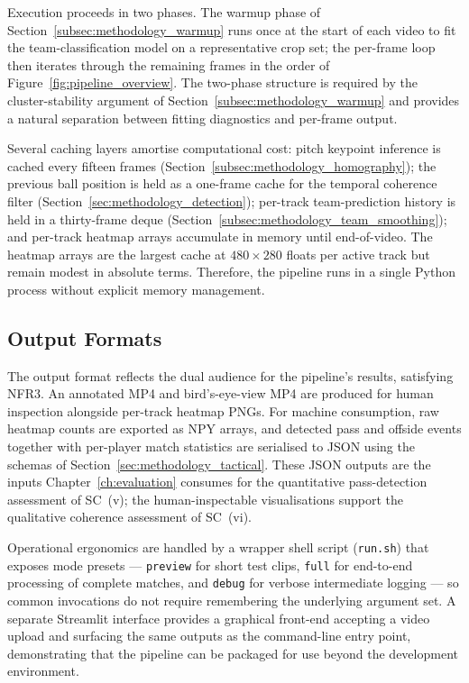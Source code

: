 Execution proceeds in two phases. The warmup phase of
Section~\ref{subsec:methodology_warmup} runs once at the start of each
video to fit the team-classification model on a representative crop set;
the per-frame loop then iterates through the remaining frames in the order
of Figure~\ref{fig:pipeline_overview}. The two-phase structure is required
by the cluster-stability argument of
Section~\ref{subsec:methodology_warmup} and provides a natural separation
between fitting diagnostics and per-frame output.

Several caching layers amortise computational cost: pitch keypoint
inference is cached every fifteen frames
(Section~\ref{subsec:methodology_homography}); the previous ball position
is held as a one-frame cache for the temporal coherence filter
(Section~\ref{sec:methodology_detection}); per-track team-prediction
history is held in a thirty-frame deque
(Section~\ref{subsec:methodology_team_smoothing}); and per-track heatmap
arrays accumulate in memory until end-of-video. The heatmap arrays are the
largest cache at $480 \times 280$ floats per active track but remain modest in
absolute terms. Therefore, the pipeline runs in a single Python process without
explicit memory management.

\subsection{Output Formats}
\label{subsec:methodology_outputs}

The output format reflects the dual audience for the pipeline's results,
satisfying NFR3. An annotated MP4 and bird's-eye-view MP4 are produced for
human inspection alongside per-track heatmap PNGs. For machine consumption,
raw heatmap counts are exported as NPY arrays, and detected pass and
offside events together with per-player match statistics are serialised to
JSON using the schemas of Section~\ref{sec:methodology_tactical}. These
JSON outputs are the inputs Chapter~\ref{ch:evaluation} consumes for the
quantitative pass-detection assessment of SC~(v); the human-inspectable
visualisations support the qualitative coherence assessment of SC~(vi).

Operational ergonomics are handled by a wrapper shell script
(\texttt{run.sh}) that exposes mode presets --- \texttt{preview} for short
test clips, \texttt{full} for end-to-end processing of complete matches,
and \texttt{debug} for verbose intermediate logging --- so common
invocations do not require remembering the underlying argument set. A
separate Streamlit interface provides a graphical front-end accepting a
video upload and surfacing the same outputs as the command-line entry
point, demonstrating that the pipeline can be packaged for use beyond the
development environment.

